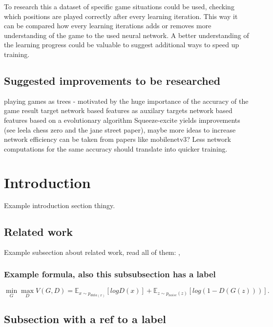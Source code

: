 \documentclass[12pt,onecolumn,oneside,titlepage]{article}
\begin{document}
To research this a dataset of specific game situations could be used, checking which positions are played correctly after every learning iteration. This way it can be compared how every learning iterations adds or removes more understanding of the game to the used neural network.
A better understanding of the learning progress could be valuable to suggest additional ways to speed up training.


\subsection{Suggested improvements to be researched}

playing games as trees - motivated by the huge importance of the accuracy of the game result target
network based features as auxilary targets 
network based features based on a evolutionary algorithm
Squeeze-excite yields improvements (see leela chess zero and the jane street paper), maybe more ideas to increase network efficiency can be taken from papers like mobilenetv3? Less network computations for the same accuracy should translate into quicker training.

\section{Introduction}
\label{sec:intro}

Example introduction section thingy.


\subsection{Related work}

Example subsection about related work, read all of them: \cite{goodfellow2014generative}, \cite{arjovsky2017wasserstein}

\subsubsection{Example formula, also this subsubsection has a label} \label{gansection}

$$ \min_G \max_D V(G, D) = \mathbb{E}_{x \sim p_{data(x)}} [ log D(x) ] + \mathbb{E}_{z \sim p_{noise}(z)}[log(1-D(G(z)))].$$

\subsection{Subsection with a ref to a label}
\end{document}
